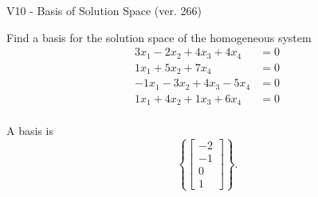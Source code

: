 \begin{exercise}
  \begin{exerciseTitle}V10 - Basis of Solution Space (ver. 266)\end{exerciseTitle}
  \begin{exerciseStatement}
    Find a basis for the solution space of the homogeneous system 
\begin{align*}
 3 x_ 1 -2 x_ 2 + 4 x_ 3 + 4 x_ 4 &= 0  \\ 
  1 x_ 1 + 5 x_ 2 + 7 x_ 4 &= 0  \\ 
  -1 x_ 1 -3 x_ 2 + 4 x_ 3 -5 x_ 4 &= 0  \\ 
  1 x_ 1 + 4 x_ 2 + 1 x_ 3 + 6 x_ 4 &= 0  \\ 
 \end{align*}


 
  \end{exerciseStatement}

  \begin{exerciseAnswer}
   A basis is   
\[\left\{\left[\begin{array}{c}
-2 \\
-1 \\
0 \\
1
\end{array}\right]\right\}.\]

  


  \end{exerciseAnswer}
\end{exercise}